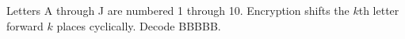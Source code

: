 Letters A through J are numbered 1 through 10. Encryption shifts the $k$th letter forward $k$ places cyclically. Decode BBBBB.
